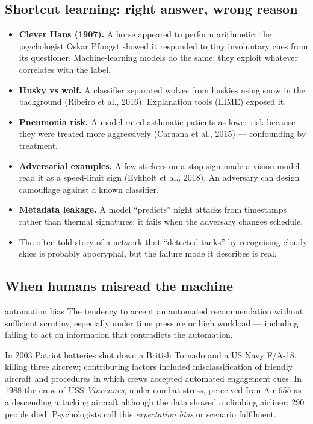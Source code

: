 \documentclass[11pt]{article}
\begin{document}
\subsection{Shortcut learning: right answer, wrong reason}
\begin{itemize}
\item \textbf{Clever Hans (1907).} A horse appeared to perform arithmetic; the psychologist Oskar Pfungst showed it responded to tiny involuntary cues from its questioner. Machine-learning models do the same: they exploit whatever correlates with the label.
\item \textbf{Husky vs wolf.} A classifier separated wolves from huskies using snow in the background (Ribeiro et al., 2016). Explanation tools (LIME) exposed it.
\item \textbf{Pneumonia risk.} A model rated asthmatic patients as lower risk because they were treated more aggressively (Caruana et al., 2015) --- confounding by treatment.
\item \textbf{Adversarial examples.} A few stickers on a stop sign made a vision model read it as a speed-limit sign (Eykholt et al., 2018). An adversary can design camouflage against a known classifier.
\item \textbf{Metadata leakage.} A model ``predicts'' night attacks from timestamps rather than thermal signatures; it fails when the adversary changes schedule.
\item The often-told story of a network that ``detected tanks'' by recognising cloudy skies is probably apocryphal, but the failure mode it describes is real.
\end{itemize}

\subsection{When humans misread the machine}
\begin{definition}{automation bias}
The tendency to accept an automated recommendation without sufficient scrutiny, especially under time pressure or high workload --- including failing to act on information that contradicts the automation.
\end{definition}
In 2003 Patriot batteries shot down a British Tornado and a US Navy F/A-18, killing three aircrew; contributing factors included misclassification of friendly aircraft and procedures in which crews accepted automated engagement cues. In 1988 the crew of USS \textit{Vincennes}, under combat stress, perceived Iran Air 655 as a descending attacking aircraft although the data showed a climbing airliner; 290 people died. Psychologists call this \emph{expectation bias} or scenario fulfilment.
\end{document}
